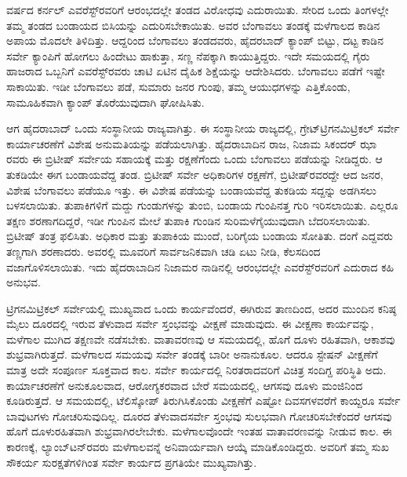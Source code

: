  ವರ್ಷದ ಕರ್ನಲ್​ ಎವರೆಸ್ಟ್​ರವರಿಗೆ ಆರಂಭದಲ್ಲೇ ತಂಡದ ವಿರೋಧವು ಎದು\break ರಾಯಿತು. ಸೇರಿದ ಒಂದು ತಿಂಗಳಲ್ಲೇ ತಮ್ಮ ತಂಡದ ಬಂಡಾಯದ ಬಿಸಿಯನ್ನು ಎದುರಿಸಬೇಕಾಯಿತು. ಅವರ ಬೆಂಗಾವಲು ತಂಡಕ್ಕೆ ಮಳೆಗಾಲದ ಕಾಡಿನ ಅಪಾಯ ಮೊದಲೇ ತಿಳಿದಿತ್ತು. ಆದ್ದರಿಂದ ಬೆಂಗಾವಲು ತಂಡದವರು, ಹೈದರಬಾದ್​ ಕ್ಯಾಂಪ್​ ಬಿಟ್ಟು, ದಟ್ಟ ಕಾಡಿನ ಸರ್ವೇ ಕ್ಯಾಂಪಿಗೆ ಹೋಗಲು ಹಿಂದೇಟು ಹಾಕುತ್ತಾ, ಸಣ್ಣ ನೆಪಕ್ಕಾಗಿ ಕಾಯುತ್ತಿದ್ದರು. ಇದೇ ಸಮಯದಲ್ಲಿ ಗೈರು ಹಾಜರಾದ ಒಬ್ಬನಿಗೆ ಎವರೆಸ್ಟ್​ರವರು ಚಾಟಿ ಏಟಿನ ದೈಹಿಕ ಶಿಕ್ಷೆಯನ್ನು ಆದೇಶಿಸಿದರು. ಬೆಂಗಾವಲು ಪಡೆಗೆ ಇಷ್ಟೇ ಸಾಕಾಯಿತು. ಇಡೀ ಬೆಂಗಾವಲು ಪಡೆ, ಸುಮಾರು  ಜನರ ಗುಂಪು, ತಮ್ಮ ಆಯುಧಗಳನ್ನು ಎತ್ತಿಕೊಂಡು, ಸಾಮೂಹಿಕವಾಗಿ ಕ್ಯಾಂಪ್​ ತೊರೆಯುವುದಾಗಿ ಘೋಷಿಸಿತು.

ಆಗ ಹೈದರಾಬಾದ್​ ಒಂದು ಸಂಸ್ಥಾನೀಯ ರಾಜ್ಯವಾಗಿತ್ತು. ಈ ಸಂಸ್ಥಾನೀಯ ರಾಜ್ಯದಲ್ಲಿ, ಗ್ರೇಟ್​ ಟ್ರಿಗನಮಿಟ್ರಿಕಲ್​ ಸರ್ವೇ ಕಾರ್ಯಾಚರಣೆಗೆ ವಿಶೇಷ ಅನುಮತಿಯನ್ನು ಪಡೆಯಲಾಗಿತ್ತು. ಹೈದರಾಬಾದಿನ ರಾಜ, ನಿಜಾಮ ಸಿಕಂದರ್​ ಝಾ ರವರು ಈ ಬ್ರಿಟೀಷ್​ ಸರ್ವೇಯ ಸಹಾಯಕ್ಕೆ ಮತ್ತು ರಕ್ಷಣೆಗೆಂದು ಒಂದು ಬೆಂಗಾವಲು ಪಡೆಯನ್ನು ನೀಡಿದ್ದರು. ಆ ತುಕಡಿಯೇ ಈಗ ಬಂಡಾಯವೆದ್ದ ತಂಡ. ಬ್ರಿಟೀಷ್​ ಸರ್ವೇ ಅಧಿಕಾರಿಗಳ ರಕ್ಷಣೆಗೆ, ಬ್ರಿಟೀಷ್​ರವರದ್ದೇ ಆದ  ಜನರ, ವಿಶೇಷ ಬೆಂಗಾವಲು ಪಡೆಯೂ ಇತ್ತು. ಈ ವಿಶೇಷ ಪಡೆಯನ್ನು ಬಂಡಾಯವೆದ್ದ ತುಕಡಿಯ ಸದ್ದನ್ನು ಅಡಗಿಸಲು ಬಳಸಲಾಯಿತು. ತುಪಾಕಿಗಳಿಗೆ ಮದ್ದು ಗುಂಡುಗಳನ್ನು ತುಂಬಿ, ಬಂಡಾಯ ಗುಂಪಿನತ್ತ ಗುರಿ ಇರಿಸಲಾಯಿತು. ಎಲ್ಲರೂ ತಕ್ಷಣ ಶರಣಾಗದಿದ್ದರೆ, ಇಡೀ ಗುಂಪಿನ ಮೇಲೆ ತುಪಾಕಿ ಗುಂಡಿನ ಸುರಿಮಳೆಗೈಯುವುದಾಗಿ ಬೆದರಿಸಲಾಯಿತು. ಬ್ರಿಟೀಷ್​ ತಂತ್ರ ಫಲಿಸಿತು. ಅಧಿಕಾರ ಮತ್ತು ತುಪಾಕಿಯ ಮುಂದೆ, ಬರಿಗೈಯ ಬಂಡಾಯ ಸೋತಿತು. ದಂಗೆ ಎದ್ದವರು ತಣ್ಣಗಾಗಿ ಶರಣಾದರು. ಅವರಲ್ಲಿ ಮೂವರಿಗೆ ಸಾರ್ವಜನಿಕವಾಗಿ ಚಡಿ ಏಟು ನೀಡಿ, ಕೆಲಸದಿಂದ ವಜಾಗೊಳಿಸಲಾಯಿತು. ಇದು ಹೈದರಾಬಾದಿನ ನಿಜಾಮರ ನಾಡಿನಲ್ಲಿ ಆರಂಭದಲ್ಲೇ ಎವರೆಸ್ಟ್​ರವರಿಗೆ ಎದುರಾದ ಕಹಿ ಅನುಭವ.

ಟ್ರಿಗನಮಿಟ್ರಿಕಲ್​ ಸರ್ವೇಯಲ್ಲಿ ಮುಖ್ಯವಾದ ಒಂದು ಕಾರ್ಯವೆಂದರೆ, ಈಗಿರುವ ತಾಣದಿಂದ, ಅದರ ಮುಂದಿನ ಕನಿಷ್ಠ  ಮೈಲು ದೂರದಲ್ಲಿ ಇರುವ ತೆಳುವಾದ ಸರ್ವೇ ಸ್ತಂಭವನ್ನು ವೀಕ್ಷಣೆ ಮಾಡುವುದು. ಈ ವೀಕ್ಷಣಾ ಕಾರ್ಯವನ್ನು, ಮಳೆಗಾಲ ಮುಗಿದ ತಕ್ಷಣವೇ ನಡೆಸಬೇಕು. ವಾತಾವರಣವು ಆ ಸಮಯದಲ್ಲಿ, ಹೊಗೆ ದೂಳು ರಹಿತವಾಗಿ, ಆಕಾಶವು ಶುಭ್ರವಾಗಿರುತ್ತದೆ. ಮಳೆಗಾಲದ ಸಮಯವು ಸರ್ವೇ ತಂಡಕ್ಕೆ ಬಾರೀ ಅನಾನುಕೂಲ. ಆದರೂ ಸ್ಟೇಷನ್​ ವೀಕ್ಷಣೆಗೆ ಮಾತ್ರ ಅದೇ ಸಂಪೂರ್ಣ ಸೂಕ್ತವಾದ ಕಾಲ. ಸರ್ವೇ ಕಾರ್ಯದಲ್ಲಿ ನಿರತರಾದವರಿಗೆ ವಿಚಿತ್ರ ಸಂದಿಗ್ದ ಪರಿಸ್ಥಿತಿ ಅದು. ಕಾರ್ಯಾಚರಣೆಗೆ ಅನುಕೂಲವಾದ, ಆರೋಗ್ಯಕರವಾದ ಬೇರೆ ಸಮಯದಲ್ಲಿ, ಆಗಸವು ದೂಳು ಮಂಜಿನಿಂದ ಕೂಡಿರುತ್ತದೆ. ಆ ಸಮಯದಲ್ಲಿ, ಟೆಲಿಸ್ಕೋಪ್​ ತಿರುಗಿಸಿಕೊಂಡು ವೀಕ್ಷಣೆಗೆ ಎಷ್ಟೋ ದಿವಸಗಳವರೆಗೆ ಕಾಯ್ದರೂ ಸರ್ವೇ ಬಾವುಟಗಳು ಗೋಚರಿಸುವುದಿಲ್ಲ. ದೂರದ ತೆಳುವಾದ\break ಸರ್ವೇ ಸ್ತಂಭವು ಸುಲಭವಾಗಿ ಗೋಚರಿಸಬೇಕೆಂದರೆ ಆಗಸವು ಹೊಗೆ ದೂಳುರಹಿತವಾಗಿ ಶುಭ್ರವಾಗಿರಲೇಬೇಕು. ಮಳೆಗಾಲವೊಂದೇ ಇಂತಹ ವಾತಾವರಣವನ್ನು ನೀಡುವ ಕಾಲ. ಈ ಕಾರಣಕ್ಕೆ, ಲ್ಯಾಂಬ್​ಟನ್​ರವರು ಮಳೆಗಾಲವನ್ನೆ ಅನಿವಾರ್ಯವಾಗಿ ಆಯ್ಕೆ ಮಾಡಿಕೊಂಡಿದ್ದರು. ಅವರಿಗೆ ತಮ್ಮ ಸುಖ ಸೌಕರ್ಯ ಸುರಕ್ಷತೆಗಳಿಗಿಂತ ಸರ್ವೇ ಕಾರ್ಯದ ಪ್ರಗತಿಯೇ ಮುಖ್ಯವಾಗಿತ್ತು.

